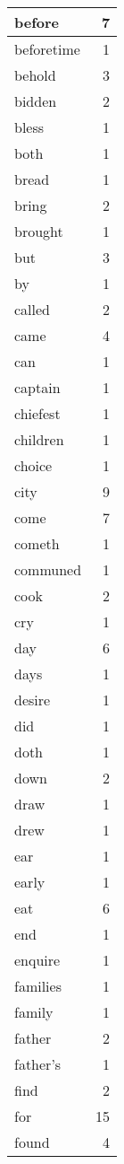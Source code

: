\begin{center}
\begin{longtable}{l|r}
before & 7 \\ \hline
beforetime & 1 \\ \hline
behold & 3 \\ \hline
bidden & 2 \\ \hline
bless & 1 \\ \hline
both & 1 \\ \hline
bread & 1 \\ \hline
bring & 2 \\ \hline
brought & 1 \\ \hline
but & 3 \\ \hline
by & 1 \\ \hline
called & 2 \\ \hline
came & 4 \\ \hline
can & 1 \\ \hline
captain & 1 \\ \hline
chiefest & 1 \\ \hline
children & 1 \\ \hline
choice & 1 \\ \hline
city & 9 \\ \hline
come & 7 \\ \hline
cometh & 1 \\ \hline
communed & 1 \\ \hline
cook & 2 \\ \hline
cry & 1 \\ \hline
day & 6 \\ \hline
days & 1 \\ \hline
desire & 1 \\ \hline
did & 1 \\ \hline
doth & 1 \\ \hline
down & 2 \\ \hline
draw & 1 \\ \hline
drew & 1 \\ \hline
ear & 1 \\ \hline
early & 1 \\ \hline
eat & 6 \\ \hline
end & 1 \\ \hline
enquire & 1 \\ \hline
families & 1 \\ \hline
family & 1 \\ \hline
father & 2 \\ \hline
father's & 1 \\ \hline
find & 2 \\ \hline
for & 15 \\ \hline
found & 4 \\ \hline

\end{longtable}
\end{center}
